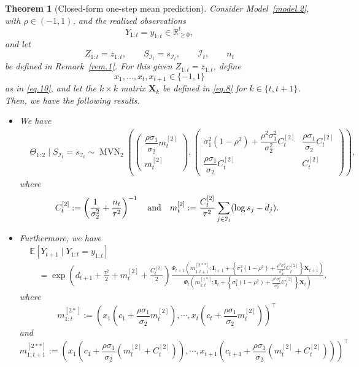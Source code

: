 \documentclass[11pt,authoryear]{elsarticle}
\def\Real{\mathbb{R}}
\def\E#1{{\mathbb E}\left[#1\right]}
\newtheorem{theorem}{Theorem}
\theoremstyle{nopunct}
\numberwithin{equation}{section}
\begin{document}
\begin{theorem}[Closed-form one-step mean prediction]
\label{thm.biv}
Consider Model~\ref{model.2}, with \(\rho\in(-1,1)\), and the realized
observations
\[
Y_{1:t}=y_{1:t}\in\Real_{\ge 0}^t,
\]
and let
\[
Z_{1:t}=z_{1:t},
\qquad
S_{\mathcal I_t}=s_{\mathcal I_t},
\qquad
\mathcal I_t,
\qquad
n_t
\]
be defined in Remark~\ref{rem.1}.
For this given
\(Z_{1:t}=z_{1:t}\), define
\[
x_1,\ldots,x_t,x_{t+1}\in\{-1,1\}
\]
as in \eqref{eq.10}, and let the \(k\times k\) matrix
\(\boldsymbol X_k\) be defined in \eqref{eq.8} for
\(k\in\{t,t+1\}\).
Then, we have the following results.

\begin{itemize}
\item[i.] We have
\begin{equation}
\label{eq2.1}
\begin{aligned}
&\Theta_{1:2}
\mid
S_{\mathcal I_t}=s_{\mathcal I_t}\sim
\operatorname{MVN}_2
\left(
\begin{pmatrix}
\dfrac{\rho\sigma_1}{\sigma_2}m_t^{[2]}\\[0.2cm]
m_t^{[2]}
\end{pmatrix},
\begin{pmatrix}
\sigma_1^2(1-\rho^2)
+
\dfrac{\rho^2\sigma_1^2}{\sigma_2^2}C_t^{[2]}
&
\dfrac{\rho\sigma_1}{\sigma_2}C_t^{[2]}\\[0.3cm]
\dfrac{\rho\sigma_1}{\sigma_2}C_t^{[2]}
&
C_t^{[2]}
\end{pmatrix}
\right),
\end{aligned}
\end{equation}
where 
\begin{equation}\label{eq.22}
C_t^{[2]}
:=
\left(
\frac{1}{\sigma_2^2}
+
\frac{n_t}{\tau^2}
\right)^{-1}
\quad\hbox{and}\quad
m_t^{[2]}
:=
\frac{C_t^{[2]}}{\tau^2}
\sum_{j\in\mathcal I_t}
(\log s_j-d_j).
\end{equation}





\item[ii.] Furthermore, we have
\[
\begin{aligned}
&\E{
Y_{t+1}
\mid
Y_{1:t}=y_{1:t}
}\\
&\quad=
\exp\left(
d_{t+1}
+
\frac{\tau^2}{2}
+
m_t^{[2]}
+
\frac{C_t^{[2]}}{2}
\right)
\frac{
\Phi_{t+1}
\left(
m_{1:t+1}^{[2**]};
\boldsymbol I_{t+1}
+
\left\{
\sigma_1^2(1-\rho^2)
+
\frac{\rho^2\sigma_1^2}{\sigma_2^2}C_t^{[2]}
\right\}
\boldsymbol X_{t+1}
\right)
}{
\Phi_t
\left(
m_{1:t}^{[1*]}
;
\boldsymbol I_t
+
\left\{
\sigma_1^2(1-\rho^2)
+
\frac{\rho^2\sigma_1^2}{\sigma_2^2}C_t^{[2]}
\right\}
\boldsymbol X_t
\right)
}.
\end{aligned}
\]
where
\[
m_{1:t}^{[2*]}:=\left(x_1\left(
c_1+
\dfrac{\rho\sigma_1}{\sigma_2}m_t^{[2]}
\right), \cdots,  x_t\left(
c_t+
\dfrac{\rho\sigma_1}{\sigma_2}m_t^{[2]}
\right)\right)^\top
\]
and
\[
m_{1:t+1}^{[2**]}:=\left(
x_1\left(
c_1+
\dfrac{\rho\sigma_1}{\sigma_2}(m_t^{[2]}+C_t^{[2]})
\right),\cdots,
x_{t+1}\left(
c_{t+1}+
\dfrac{\rho\sigma_1}{\sigma_2}(m_t^{[2]}+C_t^{[2]})
\right)
\right)^\top
\]
\end{itemize}
\end{theorem}
\end{document}
